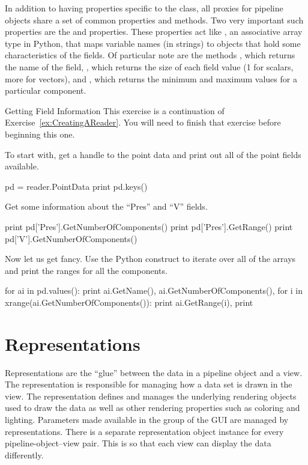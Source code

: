 In addition to having properties specific to the class, all proxies for
pipeline objects share a set of common properties and methods.  Two very
important such properties are the  and
 properties.  These properties act like
, an associative array type in Python, that maps
variable names (in strings) to  objects that
hold some characteristics of the fields.  Of particular note are the
 methods , which returns the
name of the field, , which returns the size
of each field value (1 for scalars, more for vectors), and
, which returns the minimum and maximum values for a
particular component.

\begin{exercise}{Getting Field Information}
  \label{ex:GettingFieldInformation}%
  This exercise is a continuation of Exercise~\ref{ex:CreatingAReader}.
  You will need to finish that exercise before beginning this one.

  To start with, get a handle to the point data and print out all of the
  point fields available.
  \begin{python}
pd = reader.PointData
print pd.keys()
  \end{python}

  Get some information about the ``Pres'' and ``V'' fields.
  \begin{python}
print pd['Pres'].GetNumberOfComponents()
print pd['Pres'].GetRange()
print pd['V'].GetNumberOfComponents()
  \end{python}

  Now let us get fancy.  Use the Python  construct to iterate
  over all of the arrays and print the ranges for all the components.
  \begin{python}
for ai in pd.values():
    print ai.GetName(), ai.GetNumberOfComponents(),
    for i in xrange(ai.GetNumberOfComponents()):
        print ai.GetRange(i),
    print
  \end{python}
\end{exercise}


\section{Representations}
\label{sec:Representations}

Representations are the ``glue'' between the data in a pipeline object and
a view.  The representation is responsible for managing how a data set is
drawn in the view.  The representation defines and manages the underlying
rendering objects used to draw the data as well as other rendering
properties such as coloring and lighting.  Parameters made available in the
 group of the GUI are managed by representations.  There is a
separate representation object instance for every pipeline-object--view
pair.  This is so that each view can display the data differently.

